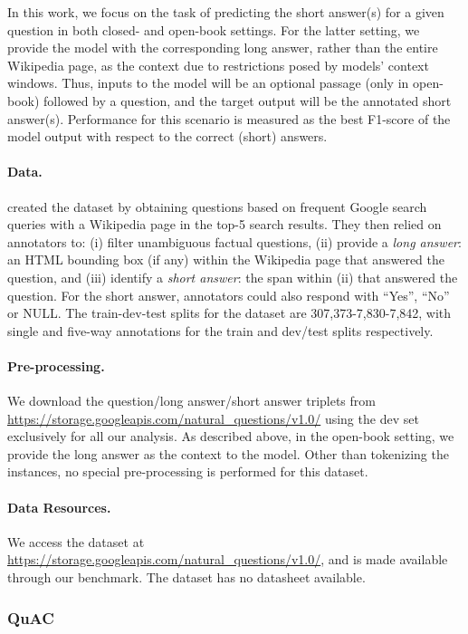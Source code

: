 In this work, we focus on the task of predicting the short answer(s) for a given question in both closed- and open-book settings.
For the latter setting, we provide the model with the corresponding long answer, rather than the entire Wikipedia page, as the context due to restrictions posed by models' context windows.
Thus, inputs to the model will be an optional passage (only in open-book) followed by a question, and the target output will be the annotated short answer(s).
Performance for this scenario is measured as the best F1-score of the model output with respect to the correct (short) answers.

\paragraph{Data.}
\citet{kwiatkowski2019natural} created the dataset by obtaining questions based on frequent Google search queries with a Wikipedia page in the top-5 search results.
They then relied on annotators to: (i) filter unambiguous factual questions, (ii) provide a \emph{long answer}: an HTML bounding box (if any) within the Wikipedia page that answered the question, and (iii) identify a \emph{short answer}: the span within (ii) that answered the question. 
For the short answer, annotators could also respond with ``Yes'', ``No'' or \textsc{NULL}.
The train-dev-test splits for the dataset are 307,373-7,830-7,842, with single and five-way annotations for the train and dev/test splits respectively.


\paragraph{Pre-processing.}
We download the question/long answer/short answer triplets from \url{https://storage.googleapis.com/natural_questions/v1.0/} using the dev set exclusively for all our analysis.
As described above, in the open-book setting, we provide the long answer as the context to the model.
Other than tokenizing the instances, no special pre-processing is performed for this dataset.


\paragraph{Data Resources.}
We access the dataset at \url{https://storage.googleapis.com/natural_questions/v1.0/}, and is made available through our benchmark.
The dataset has no datasheet available.

\subsubsection{QuAC}

